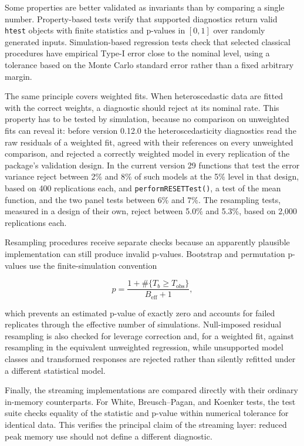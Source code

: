 Some properties are better validated as invariants than by comparing a single
number. Property-based tests verify that supported diagnostics return valid
\texttt{htest} objects with finite statistics and p-values in \([0,1]\) over randomly
generated inputs. Simulation-based regression tests check that selected
classical procedures have empirical Type-I error close to the nominal level,
using a tolerance based on the Monte Carlo standard error rather than a fixed
arbitrary margin.

The same principle covers weighted fits. When heteroscedastic data are fitted
with the correct weights, a diagnostic should reject at its nominal rate. This
property has to be tested by simulation, because no comparison on unweighted
fits can reveal it: before version 0.12.0 the heteroscedasticity diagnostics
read the raw residuals of a weighted fit, agreed with their references on
every unweighted comparison, and rejected a correctly weighted model in every
replication of the package's validation design. In the current version
29 functions that test the error variance reject
between 2\% and
8\% of such models at the 5\%
level in that design, based on 400
replications each, and \texttt{performRESETTest()}, a test of the mean function, and
the two panel tests between 6\% and
7\%.
The resampling tests, measured in a design of their own, reject between
5.0\% and
5.3\%, based on
2,000 replications each.

Resampling procedures receive separate checks because an apparently plausible
implementation can still produce invalid p-values. Bootstrap and permutation
p-values use the finite-simulation convention

\[
  p = \frac{1 + \#\{T_b \ge T_{\mathrm{obs}}\}}
           {B_{\mathrm{eff}} + 1},
\]

which prevents an estimated p-value of exactly zero and accounts for failed
replicates through the effective number of simulations. Null-imposed residual
resampling is also checked for leverage correction and, for a weighted fit,
against resampling in the equivalent unweighted regression, while unsupported
model classes and transformed responses are rejected rather than silently
refitted under a different statistical model.

Finally, the streaming implementations are compared directly with their
ordinary in-memory counterparts. For White, Breusch--Pagan, and Koenker tests,
the test suite checks equality of the statistic and p-value within numerical
tolerance for identical data. This verifies the principal claim of the
streaming layer: reduced peak memory use should not define a different
diagnostic.

